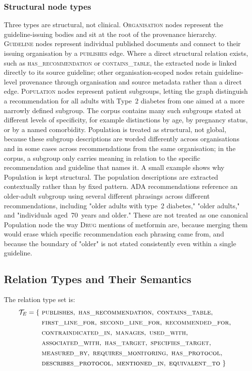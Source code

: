 \subsubsection{Structural node types}
Three types are structural, not clinical. \textsc{Organisation} nodes represent the guideline-issuing bodies and sit at the root of the provenance hierarchy. \textsc{Guideline} nodes represent individual published documents and connect to their issuing organisation by a \textsc{publishes} edge. Where a direct structural relation exists, such as \textsc{has\_recommendation} or \textsc{contains\_table}, the extracted node is linked directly to its source guideline; other organisation-scoped nodes retain guideline-level provenance through organisation and source metadata rather than a direct edge. \textsc{Population} nodes represent patient subgroups, letting the graph
distinguish a recommendation for all adults with Type~2 diabetes from
one aimed at a more narrowly defined subgroup. The corpus contains many
such subgroups stated at different levels of specificity, for example
distinctions by age, by pregnancy status, or by a named comorbidity.
Population is treated as structural, not global, because these
subgroup descriptions are worded differently across organisations and
in some cases across recommendations from the same organisation; in
the corpus, a subgroup only carries meaning in relation to the specific
recommendation and guideline that names it.
A small example shows why Population is kept structural. The
population descriptions are extracted contextually rather than by
fixed pattern. ADA recommendations reference an older-adult subgroup using several
different phrasings across different recommendations, including
"older adults with type~2 diabetes," "older adults," and
"individuals aged~70~years and older." These are not treated as one
canonical Population node the way \textsc{Drug} mentions of metformin
are, because merging them would erase which specific recommendation
each phrasing came from, and because the boundary of "older" is not
stated consistently even within a single guideline.


\subsection{Relation Types and Their Semantics}
\label{sec:relation-types}

The relation type set is:
\begin{align*}
\mathcal{T}_E = \{\ &\textsc{publishes},\ \textsc{has\_recommendation},\ \textsc{contains\_table},\ \\
&\textsc{first\_line\_for},\ \textsc{second\_line\_for},\ \textsc{recommended\_for},\ \\
&\textsc{contraindicated\_in},\ \textsc{manages},\ \textsc{used\_with},\ \\
&\textsc{associated\_with},\ \textsc{has\_target},\ \textsc{specifies\_target},\ \\
&\textsc{measured\_by},\ \textsc{requires\_monitoring},\ \textsc{has\_protocol},\ \\
&\textsc{describes\_protocol},\ \textsc{mentioned\_in},\ \textsc{equivalent\_to}\ \}
\end{align*}

